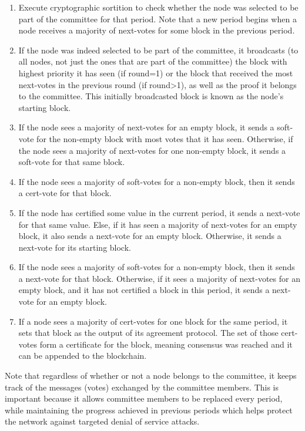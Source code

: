 \begin{enumerate}
  \item Execute cryptographic sortition to check whether the node was selected to be part of the committee for that period. Note that a new period begins when a node receives a majority of next-votes for some block in the previous period.
  \item If the node was indeed selected to be part of the committee, it broadcasts (to all nodes, not just the ones that are part of the committee) the block with highest priority it has seen (if round=1) or the block that received the most next-votes in the previous round (if round>1), as well as the proof it belongs to the committee. This initially broadcasted block is known as the node’s starting block.
  \item If the node sees a majority of next-votes for an empty block, it sends a soft-vote for the non-empty block with most votes that it has seen. Otherwise, if the node sees a majority of next-votes for one non-empty block, it sends a soft-vote for that same block.
  \item If the node sees a majority of soft-votes for a non-empty block, then it sends a cert-vote for that block.
  \item If the node has certified some value in the current period, it sends a next-vote for that same value. Else, if it has seen a majority of next-votes for an empty block, it also sends a next-vote for an empty block. Otherwise, it sends a next-vote for its starting block.
  \item If the node sees a majority of soft-votes for a non-empty block, then it sends a next-vote for that block. Otherwise, if it sees a majority of next-votes for an empty block, and it has not certified a block in this period, it sends a next-vote for an empty block.
  \item If a node sees a majority of cert-votes for one block for the same period, it sets that block as the output of its agreement protocol. The set of those cert-votes form a certificate for the block, meaning consensus was reached and it can be appended to the blockchain.
\end{enumerate}

Note that regardless of whether or not a node belongs to the committee, it keeps track of the messages (votes) exchanged by the committee members. This is important because it allows committee members to be replaced every period, while maintaining the progress achieved in previous periods which helps protect the network against targeted denial of service attacks.


